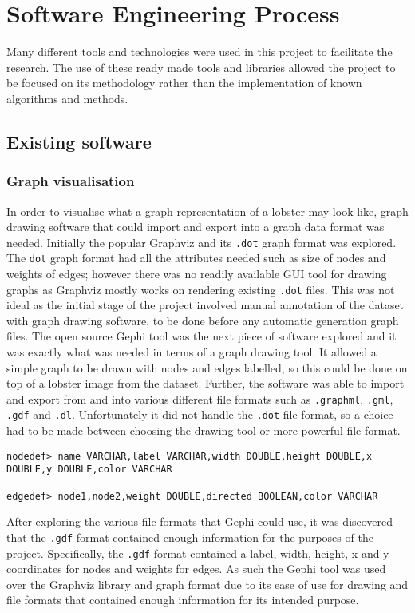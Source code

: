 \section{Software Engineering Process}
Many different tools and technologies were used in this project to facilitate the research. The use of these ready made tools and libraries allowed the project to be focused on its methodology rather than the implementation of known algorithms and methods. 
\subsection{Existing software}

\subsubsection{Graph visualisation}
In order to visualise what a graph representation of a lobster may look like, graph drawing software that could import and export into a graph data format was needed. Initially the popular Graphviz and its \texttt{.dot} graph format \cite{graphviz-dot} was explored. The \texttt{dot} graph format had all the attributes needed such as size of nodes and weights of edges; however there was no readily available GUI tool for drawing graphs as Graphviz mostly works on rendering existing \texttt{.dot} files. This was not ideal as the initial stage of the project involved manual annotation of the dataset with graph drawing software, to be done before any automatic generation graph files. 
\n
The open source Gephi \cite{gephi} tool was the next piece of software explored and it was exactly what was needed in terms of a graph drawing tool. It allowed a simple graph to be drawn with nodes and edges labelled, so this could be done on top of a lobster image from the dataset. Further, the software was able to import and export from and into various different file formats such as \texttt{.graphml}, \texttt{.gml}, \texttt{.gdf} and \texttt{.dl}. Unfortunately it did not handle the \texttt{.dot} file format, so a choice had to be made between choosing the drawing tool or more powerful file format. 
\begin{lstlisting}[caption={Header formats for \texttt{.gdf} files showing the kind of node and edge data it could keep.}]
nodedef> name VARCHAR,label VARCHAR,width DOUBLE,height DOUBLE,x DOUBLE,y DOUBLE,color VARCHAR

edgedef> node1,node2,weight DOUBLE,directed BOOLEAN,color VARCHAR
\end{lstlisting}
After exploring the various file formats that Gephi could use, it was discovered that the \texttt{.gdf} format contained enough information for the purposes of the project. Specifically, the \texttt{.gdf} format contained a label, width, height, x and y coordinates for nodes and weights for edges. As such the Gephi tool was used over the Graphviz library and graph format due to its ease of use for drawing and file formats that contained enough information for its intended purpose.

